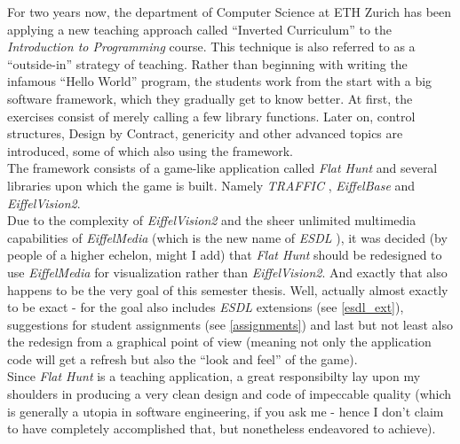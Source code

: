 For two years now, the department of Computer Science at ETH Zurich has been applying a new teaching approach called ``Inverted Curriculum'' \cite{bm03} \cite{mp03} \cite{mk04} to the \emph{Introduction to Programming} course. This technique is also referred to as a ``outside-in'' strategy of teaching. Rather than beginning with writing the infamous ``Hello World'' program, the students work from the start with a big software framework, which they gradually get to know better. At first, the exercises consist of merely calling a few library functions. Later on, control structures, Design by Contract, genericity and other advanced topics are introduced, some of which also using the framework.\\
The framework consists of a game-like application called \emph{Flat Hunt} and several libraries upon which the game is built. Namely \emph{TRAFFIC} \cite{sa05}, \emph{EiffelBase} and \emph{EiffelVision2}.\\

Due to the complexity of \emph{EiffelVision2} and the sheer unlimited multimedia capabilities of \emph{EiffelMedia} (which is the new name of \emph{ESDL} \cite{bb04} \cite{tgb03} \cite{rb05}), it was decided (by people of a higher echelon, might I add) that \emph{Flat Hunt} should be redesigned to use \emph{EiffelMedia} for visualization rather than \emph{EiffelVision2}. And exactly that also happens to be the very goal of this semester thesis. Well, actually almost exactly to be exact - for the goal also includes \emph{ESDL} extensions (see \autoref{esdl_ext}), suggestions for student assignments (see \autoref{assignments}) and last but not least also the redesign from a graphical point of view (meaning not only the application code will get a refresh but also the ``look and feel'' of the game).\\

Since \emph{Flat Hunt} is a teaching application, a great responsibilty lay upon my shoulders in producing a very clean design and code of impeccable quality (which is generally a utopia in software engineering, if you ask me - hence I don't claim to have completely accomplished that, but nonetheless endeavored to achieve). 
